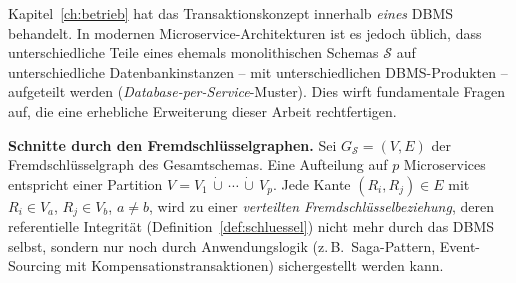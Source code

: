 ﻿\documentclass[a4paper,12pt]{report}
\theoremstyle{definition}
\theoremstyle{remark}
\begin{document}
Kapitel~\ref{ch:betrieb} hat das Transaktionskonzept innerhalb
\emph{eines} DBMS behandelt. In modernen
Microservice-Architekturen ist es jedoch üblich, dass
unterschiedliche Teile eines ehemals monolithischen Schemas
$\mathcal{S}$ auf unterschiedliche Datenbankinstanzen -- mit
unterschiedlichen DBMS-Produkten -- aufgeteilt werden
(\emph{Database-per-Service}-Muster). Dies wirft fundamentale Fragen
auf, die eine erhebliche Erweiterung dieser Arbeit rechtfertigen.

\textbf{Schnitte durch den Fremdschlüsselgraphen.} Sei
$G_{\mathcal{S}}=(V,E)$ der Fremdschlüsselgraph des
Gesamtschemas. Eine Aufteilung auf $p$ Microservices entspricht einer
Partition $V=V_1\,\dot\cup\,\cdots\,\dot\cup\,V_p$. Jede Kante
$(R_i,R_j)\in E$ mit $R_i\in V_a$, $R_j\in V_b$, $a\neq b$, wird zu
einer \emph{verteilten Fremdschlüsselbeziehung}, deren referentielle
Integrität (Definition~\ref{def:schluessel}) nicht mehr durch das DBMS
selbst, sondern nur noch durch Anwendungslogik (z.\,B.\
Saga-Pattern, Event-Sourcing mit Kompensationstransaktionen)
sichergestellt werden kann.
\end{document}
